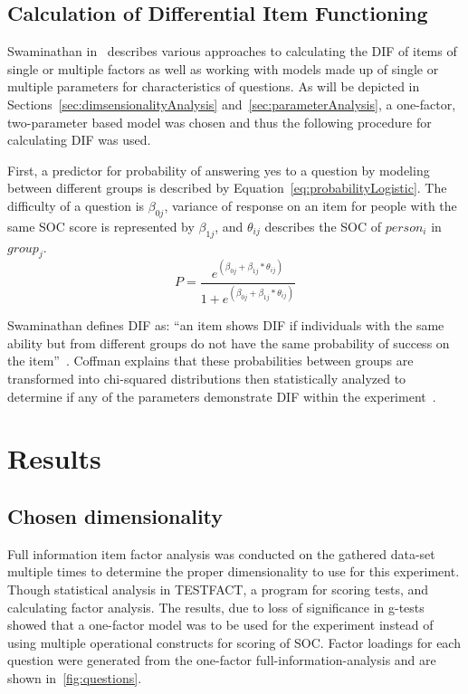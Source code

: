 \documentclass{sig-alternate}
\begin{document}
\subsection{Calculation of Differential Item Functioning}
Swaminathan in~\cite{logisticDIF:1990} describes various approaches to calculating the DIF of items of single or multiple factors as well as working with models made up of single or multiple parameters for characteristics of questions. As will be depicted in Sections~\ref{sec:dimsensionalityAnalysis} and~\ref{sec:parameterAnalysis}, a one-factor, two-parameter based model was chosen and thus the following procedure for calculating DIF was used. 

First, a predictor for probability of answering yes to a question by modeling between different groups is described by Equation~\ref{eq:probabilityLogistic}. The difficulty of a question is $\beta_{0j}$, variance of response on an item for people with the same SOC score is represented by $\beta_{1j}$, and $\theta_{ij}$ describes the SOC of $person_i$ in $group_j$.
\begin{equation}
\label{eq:probabilityLogistic}
P =  \frac{e^{(\beta_{0j} + \beta_{1j}*\theta_{ij})}}{1+e^{(\beta_{0j} + \beta_{1j}*\theta_{ij})}} 
\end{equation}

Swaminathan defines DIF as: ``an item shows DIF if individuals with the same ability but from different groups do not have the same probability of success on the item''~\cite{logisticDIF:1990}.
Coffman explains that these probabilities between groups are transformed into chi-squared distributions then statistically analyzed to determine if any of the parameters demonstrate DIF within the experiment~\cite{disparities:2009}.



\section{Results}
\label{sec:results}
\subsection{Chosen dimensionality}
Full information item factor analysis was conducted on the gathered data-set multiple times to determine the proper dimensionality to use for this experiment. Though statistical analysis in TESTFACT, a program for scoring tests, and calculating factor analysis. The results, due to loss of significance in g-tests showed that a one-factor model was to be used for the experiment instead of using multiple operational constructs for scoring of SOC. Factor loadings for each question were generated from the one-factor full-information-analysis and are shown in~\ref{fig:questions}.
\end{document}
